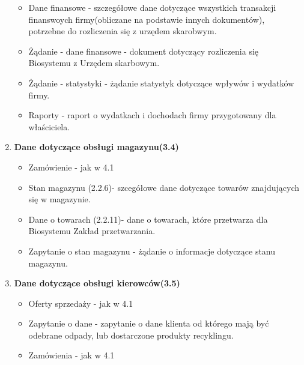 \begin{enumerate}
\begin{itemize}
		\item Dane finansowe - szczegółowe dane dotyczące wszystkich transakcji finanswoych firmy(obliczane na podstawie innych dokumentów), potrzebne do rozliczenia się z urzędem skarobwym.
		\item Żądanie - dane finansowe - dokument dotyczący rozliczenia się Biosystemu z Urzędem skarbowym. 
		\item Żądanie - statystyki - żądanie statystyk dotyczące wpływów i wydatków firmy.
		\item Raporty - raport o wydatkach i dochodach firmy przygotowany dla właściciela.
	\end{itemize}
\item \textbf{Dane dotyczące obsługi magazynu(3.4)}
	\begin{itemize}
		\item Zamówienie - jak w 4.1
		\item Stan magazynu (2.2.6)- szcegółowe dane dotyczące towarów znajdujących się w magazynie.
		\item Dane o towarach (2.2.11)- dane o towarach, które przetwarza dla Biosystemu Zakład przetwarzania.
		\item Zapytanie o stan magazynu - żądanie o informacje dotyczące stanu magazynu.
	\end{itemize}
\item \textbf{Dane dotyczące obsługi kierowców(3.5)}
	\begin{itemize}
		\item Oferty sprzedaży - jak w 4.1
		\item Zapytanie o dane - zapytanie o dane klienta od którego mają być odebrane odpady, lub dostarczone produkty recyklingu.
		\item Zamówienia - jak w 4.1
	\end{itemize}
\end{enumerate}
